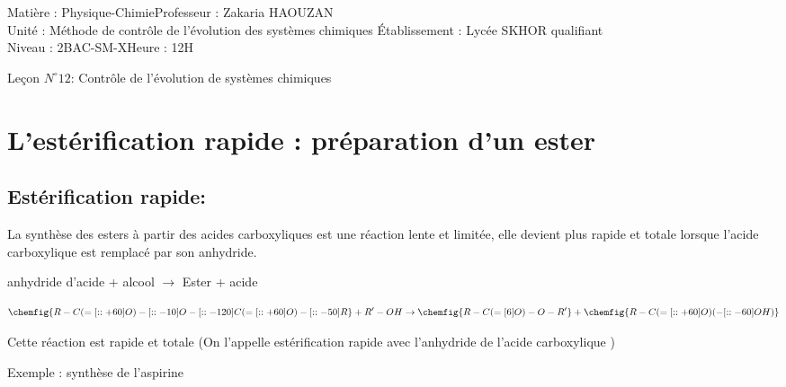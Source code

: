 \documentclass[12pt]{article}
\author{Zakaria HAOUZAN}
\date{\today}
\newcommand\headerMe[2]{\noindent{}#1\hfill#2}
\begin{document}
\headerMe{Matière : Physique-Chimie}{Professeur : Zakaria HAOUZAN}\\
\headerMe{Unité : Méthode de
contrôle de
l’évolution des
systèmes
chimiques }{Établissement : Lycée SKHOR qualifiant}\\
\headerMe{Niveau : 2BAC-SM-X}{Heure : 12H}\\

\begin{center}

  \Large{Leçon $N^{\circ} 12 $: \color{red} Contrôle de l’évolution de systèmes chimiques}
\end{center}






\section{L'estérification rapide : préparation d'un ester }
\subsection{Estérification rapide:}
La synthèse des esters à partir des acides carboxyliques est une réaction lente et limitée, elle devient plus rapide et
totale lorsque l’acide carboxylique est remplacé par son anhydride.

anhydride d'acide + alcool $\rightarrow$ Ester + acide


$$\chemfig{R-C(=[::+60]O)-[::-10]O-[::-120]C(=[::+60]O)-[::-50]R} + R'-OH \rightarrow \chemfig{R-C(=[6]O)-O-R'} + \chemfig{R-C(=[::+60]O)(-[::-60]OH)}$$

Cette réaction est rapide et totale (On l’appelle estérification rapide avec l’anhydride de l’acide carboxylique )

Exemple : synthèse de l'aspirine 
\end{document}
